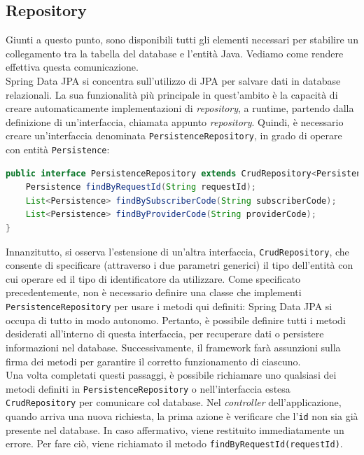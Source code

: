 \subsection{Repository}

Giunti a questo punto, sono disponibili tutti gli elementi necessari per stabilire un collegamento tra la tabella del database e l’entità Java. Vediamo come rendere effettiva questa comunicazione.\\
Spring Data JPA si concentra sull'utilizzo di JPA per salvare dati in database relazionali. La sua funzionalità più principale in quest’ambito è la capacità di creare automaticamente implementazioni di \textit{repository}, a runtime, partendo dalla definizione di un'interfaccia, chiamata appunto \textit{repository}. Quindi, è necessario creare un’interfaccia denominata \texttt{PersistenceRepository}, in grado di operare con entità \texttt{Persistence}:
\begin{lstlisting}[language=Java, caption=Implementazione dell'interfaccia Repository.]
public interface PersistenceRepository extends CrudRepository<Persistence, String> {
    Persistence findByRequestId(String requestId);
    List<Persistence> findBySubscriberCode(String subscriberCode);
    List<Persistence> findByProviderCode(String providerCode);
}
\end{lstlisting}
Innanzitutto, si osserva l’estensione di un’altra interfaccia, \texttt{CrudRepository}, che consente di specificare (attraverso i due parametri generici) il tipo dell’entità con cui operare ed il tipo di identificatore da utilizzare. Come specificato precedentemente, non è necessario definire una classe che implementi \texttt{PersistenceRepository} per usare i metodi qui definiti: Spring Data JPA si occupa di tutto in modo autonomo. Pertanto, è possibile definire tutti i metodi desiderati all’interno di questa interfaccia, per recuperare dati o persistere informazioni nel database. Successivamente, il framework farà assunzioni sulla firma dei metodi per garantire il corretto funzionamento di ciascuno.\\
Una volta completati questi passaggi, è possibile richiamare uno qualsiasi dei metodi definiti in \texttt{PersistenceRepository} o nell’interfaccia estesa \texttt{CrudRepository} per comunicare col database. Nel \textit{controller} dell’applicazione, quando arriva una nuova richiesta, la prima azione è verificare che l’\texttt{id} non sia già presente nel database. In caso affermativo, viene restituito immediatamente un errore. Per fare ciò, viene richiamato il metodo \texttt{findByRequestId(requestId)}.

